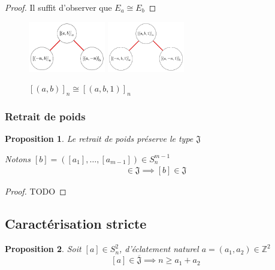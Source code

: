 \documentclass{article}
\newtheorem{proposition}{Proposition}
\begin{document}
\begin{proof}
    Il suffit d'observer que $E_a \cong E_b$
\end{proof}

\begin{figure}[h]
    \caption{${[(a, b)]}_n \cong {[(a, b, 1)]}_n$}
    \centering
    \includegraphics[width=0.3\textwidth]{abn}
    \includegraphics[width=0.3\textwidth]{ab1n}
\end{figure}

\subsubsection{Retrait de poids}

\begin{proposition}
    Le retrait de poids préserve le type $\mathfrak{J}$

    Notons $[b] = ([a_1], \dots, [a_{m-1}]) \in S_n^{m-1}$
    \begin{align*}
        [a] \in \mathfrak{J} \implies [b] \in \mathfrak{J}
    \end{align*}
\end{proposition}

\begin{proof}
    TODO
\end{proof}

\newpage

\subsection{Caractérisation stricte}

\begin{proposition}
    Soit $[a] \in S_n^2$, d'éclatement naturel $a = (a_1, a_2) \in \mathbb{Z}^2$
    \[ [a] \in \overline{\mathfrak{J}} \implies n \geq a_1 + a_2 \]
\end{proposition} 
\end{document}
